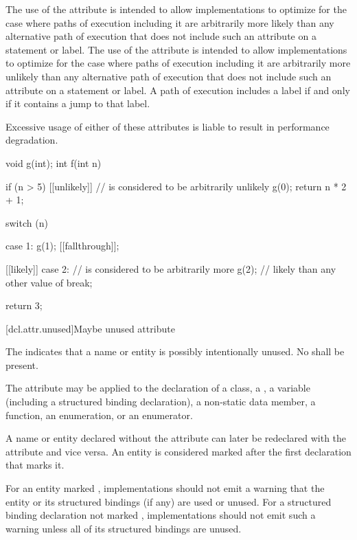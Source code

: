 \pnum
\recommended
The use of the  attribute
is intended to allow implementations to optimize for
the case where paths of execution including it
are arbitrarily more likely
than any alternative path of execution
that does not include such an attribute on a statement or label.
The use of the  attribute
is intended to allow implementations to optimize for
the case where paths of execution including it
are arbitrarily more unlikely
than any alternative path of execution
that does not include such an attribute on a statement or label.
A path of execution includes a label
if and only if it contains a jump to that label.
\begin{note}
Excessive usage of either of these attributes
is liable to result in performance degradation.
\end{note}

\pnum
\begin{example}
\begin{codeblock}
void g(int);
int f(int n) {
  if (n > 5) [[unlikely]] {     //  is considered to be arbitrarily unlikely
    g(0);
    return n * 2 + 1;
  }

  switch (n) {
  case 1:
    g(1);
    [[fallthrough]];

  [[likely]] case 2:            //  is considered to be arbitrarily more
    g(2);                       // likely than any other value of 
    break;
  }
  return 3;
}
\end{codeblock}
\end{example}

[dcl.attr.unused]{Maybe unused attribute}%

\pnum
The  
indicates that a name or entity is possibly intentionally unused.
No  shall be present.

\pnum
The attribute may be applied to the declaration of a class,
a ,
a variable (including a structured binding declaration),
a non-static data member,
a function, an enumeration, or an enumerator.

\pnum
A name or entity declared without the  attribute
can later be redeclared with the attribute
and vice versa.
An entity is considered marked
after the first declaration that marks it.

\pnum
\recommended
For an entity marked ,
implementations should not emit a warning
that the entity or its structured bindings (if any)
are used or unused.
For a structured binding declaration not marked ,
implementations should not emit such a warning unless
all of its structured bindings are unused.

